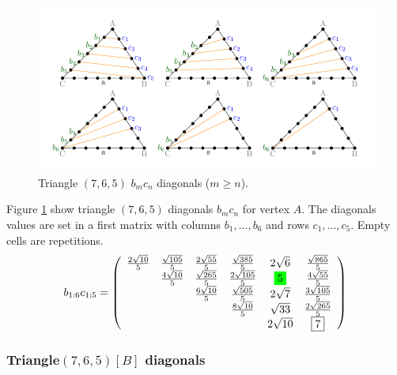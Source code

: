 \documentclass[11pt]{article}
\begin{document}
\begin{figure}[htp]
\centering
\includegraphics[scale=1]{t765bc}
\caption{Triangle $(7,6,5)$ $b_mc_n$ diagonals ($m \ge n$).}
\label{t765bc}
\end{figure}
Figure \ref{t765bc} show triangle $(7,6,5)$ diagonals $b_mc_n$ for vertex $A$.
The diagonals values are set in a first matrix with columns $b_1,...,b_6$ and rows $c_1,...,c_5$. Empty cells are repetitions.
\begin{equation}\label{eq:appendrow}
b_{1:6}c_{1:5} = \left(\begin{array}{cccccc}
	\frac{2\sqrt{10}}{5} & \frac{\sqrt{105}}{5} & \frac{2\sqrt{55}}{5} & \frac{\sqrt{385}}{5} & 2\sqrt{6} & \frac{\sqrt{865}}{5} \\
	& \frac{4\sqrt{10}}{5} & \frac{\sqrt{265}}{5} & \frac{2\sqrt{105}}{5} & \five & \frac{4\sqrt{55}}{5} \\
	& & \frac{6\sqrt{10}}{5} & \frac{\sqrt{505}}{5} & 2\sqrt{7} & \frac{3\sqrt{105}}{5}\\
	& & & \frac{8\sqrt{10}}{5} & \sqrt{33} & \frac{2\sqrt{265}}{5}\\
	& & & & 2\sqrt{10} & \boxed{7} \\
\end{array}\right)
\end{equation}

\subsubsection{Triangle$(7,6,5)[B]$ diagonals}
\end{document}
